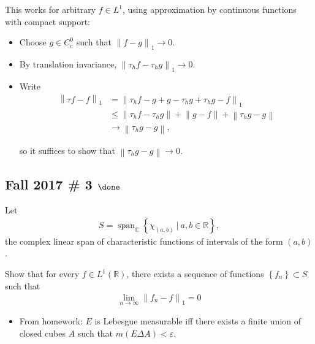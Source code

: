 \begin{remark}

This works for arbitrary \(f\in L^1\), using approximation by continuous
functions with compact support:

\begin{itemize}
\item
  Choose \(g\in C_c^0\) such that
  \({\left\lVert {f- g} \right\rVert}_1 \to 0\).
\item
  By translation invariance,
  \({\left\lVert {\tau_h f - \tau_h g} \right\rVert}_1 \to 0\).
\item
  Write
  \begin{align*}
  {\left\lVert {\tau f - f} \right\rVert}_1 
  &= {\left\lVert {\tau_h f - g + g - \tau_h g + \tau_h g - f} \right\rVert}_1 \\
  &\leq {\left\lVert {\tau_h f - \tau_h g} \right\rVert} + {\left\lVert {g - f} \right\rVert} + {\left\lVert {\tau_h g - g} \right\rVert} \\
  &\to {\left\lVert {\tau_h g - g} \right\rVert}
  ,\end{align*}

  so it suffices to show that
  \({\left\lVert {\tau_h g - g} \right\rVert} \to 0\).
\end{itemize}

\end{remark}

\hypertarget{fall-2017-3-done}{%
\subsection{\texorpdfstring{Fall 2017 \# 3
\(\done\)}{Fall 2017 \# 3 \textbackslash done}}\label{fall-2017-3-done}}

Let
\begin{align*}
S = {\operatorname{span}}_{\mathbb{C}}\left\{{\chi_{(a, b)} {~\mathrel{\Big|}~}a, b \in {\mathbb{R}}}\right\},
\end{align*}
the complex linear span of characteristic functions of intervals of the
form \((a, b)\).

Show that for every \(f\in L^1({\mathbb{R}})\), there exists a sequence
of functions \(\left\{{f_n}\right\} \subset S\) such that
\begin{align*}
\lim _{n \rightarrow \infty}\left\|f_{n}-f\right\|_{1}=0
\end{align*}


\begin{concept}

\envlist

\begin{itemize}
\tightlist
\item
  From homework: \(E\) is Lebesgue measurable iff there exists a finite
  union of closed cubes \(A\) such that \(m(E\Delta A) < \varepsilon\).
\end{itemize}

\end{concept}

